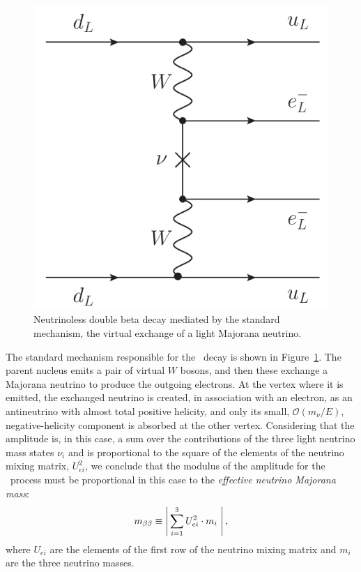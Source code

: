 \begin{figure}
\centering
\includegraphics[scale=0.625]{img/LightNuExchange.pdf}
\caption{Neutrinoless double beta decay mediated by the standard mechanism, the virtual exchange of a light Majorana neutrino.} \label{fig:LightMajoranaNuExchange}
\end{figure}

The standard mechanism responsible for the \bbonu\ decay is shown in Figure~\ref{fig:LightMajoranaNuExchange}.  The parent nucleus emits a pair of virtual $W$ bosons, and then these exchange a Majorana neutrino to produce the outgoing electrons. At the vertex where it is emitted, the exchanged neutrino is created, in association with an electron, as an antineutrino with almost total positive helicity, and only its small, $\mathcal{O}(m_{\nu}/E)$, negative-helicity component is absorbed at the other vertex. Considering that the amplitude is, in this case, a sum over the contributions of the three light neutrino mass states $\nu_i$ and is proportional to the square of the elements of the neutrino mixing matrix, $U_{ei}^2$, we conclude that the modulus of the amplitude for the \bbonu\ process must be proportional in this case to the \emph{effective neutrino Majorana mass}:
\begin{equation}
\mbb \equiv \left|\, \sum_{i=1}^3 U_{ei}^2\cdot m_i\ \right|, \label{eq:mbb}
\end{equation}
where $U_{ei}$ are the elements of the first row of the neutrino mixing matrix and $m_{i}$ are the three neutrino masses.

